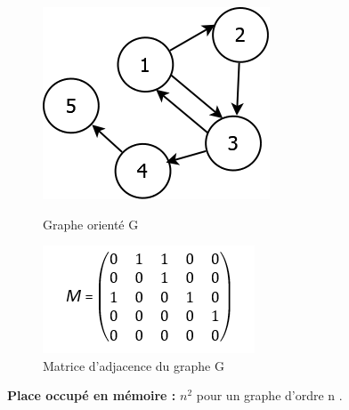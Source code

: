 \begin{figure}[H]
	\begin{minipage}[c]{.46\linewidth}
	\begin{center}
		\includegraphics[height=100 pt, width=110 pt]{./ressources/image/graphAdjace.png} 
		\caption{Graphe orienté G}
		\label{grapAdjac}
	\end{center}
	\end{minipage} 
	\begin{minipage}[c]{.46\linewidth}
	\begin{center}
		\includegraphics[height=110 pt, width=140 pt]{./ressources/image/matriceAdjac.png} 
		\caption{Matrice d'adjacence du graphe G}
		\label{matriceAdjac}
	\end{center}
	\end{minipage} 
\end{figure} 

\textbf{Place occupé en mémoire :} ${n}^{2}$ pour un graphe d'ordre n \citep{lopez2003cours}.			

